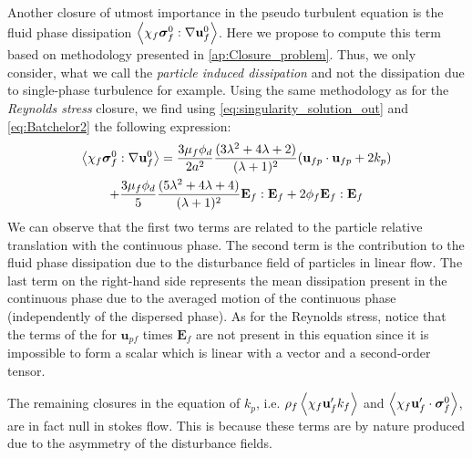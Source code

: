 Another closure of utmost importance in the pseudo turbulent equation is the fluid phase dissipation $\left<\chi_f \bm\sigma_f^0 :\mathbf{\nabla}\textbf{u}_f^0\right>$. 
Here we propose to compute this term based on  methodology presented in \ref{ap:Closure_problem}. 
Thus, we only consider, what we call the \textit{particle induced dissipation} and not the dissipation due to single-phase turbulence for example.
Using the same methodology as for the \textit{Reynolds stress} closure, we find using \ref{eq:singularity_solution_out} and \ref{eq:Batchelor2} the following expression: 
\begin{multline}
    \avg{\chi_f \bm\sigma_f^0 :\grad\textbf{u}_f^0}
    =
    \frac{3\mu_f \phi_d}{2a^2}
    \frac{(3\lambda^2 + 4\lambda +2)}{(\lambda + 1)^2}
    (\textbf{u}_{fp}\cdot \textbf{u}_{fp} + 2 k_p ) \\
    + 
    \frac{3\mu_f \phi_d}{5}
    \frac{(5\lambda^2 + 4\lambda +4)}{(\lambda + 1)^2}
    \textbf{E}_f:\textbf{E}_f
    +2 \phi_f \textbf{E}_f:\textbf{E}_f
    \label{eq:dissipation_term}
\end{multline}
We can observe that the first two terms are related to the particle relative translation with the continuous phase. 
The second term is the contribution to the fluid phase dissipation due to the  disturbance field of particles in linear flow. 
The last term on the right-hand side represents the mean dissipation present in the continuous phase due to the averaged motion of the continuous phase (independently of the dispersed phase). 
As for the Reynolds stress, notice that the terms of the for $\textbf{u}_{pf}$ times $\textbf{E}_f$ are not present in this equation since it is impossible to form a scalar which is linear with a vector and a second-order tensor. 



The remaining closures in the equation of $k_p$, i.e. $\rho_f \left<\chi_f \textbf{u}_f' k_f\right>$ and $\left<\chi_f \textbf{u}_f' \cdot \bm{\sigma}_f^0\right>$, are in fact null in stokes flow. 
This is because these terms are by nature produced due to the asymmetry of the disturbance fields. 


